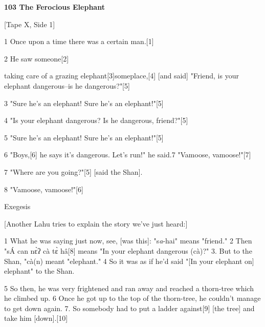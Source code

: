 
\textbf{103 The Ferocious Elephant }

[Tape X, Side 1]

1 Once upon a time there was a certain man.[1]

2 He saw someone[2]

taking care of a grazing elephant[3]someplace,[4] [and said] "Friend,
is your elephant dangerous--is he dangerous?"[5]

3 "Sure he's an elephant! Sure he's an elephant!"[5]

4 "Is your elephant dangerous? Is he dangerous, friend?"[5]

5 "Sure he's an elephant! Sure he's an elephant!"[5]

6 "Boys,[6] he says it's dangerous. Let's run!" he said.7 "Vamoose,
vamoose!"[7]

7 "Where are you going?"[5] [said the Shan].

8 "Vamoose, vamoose!"[6]

\begin{center}
Exegesis
\end{center}

\leftskip=0pt
[Another Lahu tries to explain the story we've just heard:]

1 What he was saying just now, see, [was this]: "s\textit{a}-hai"
means "friend." 2 Then "sÁ can nɛ̀ʔ cà tɛ̀ hâ[8]
means "In your elephant dangerous (cà)?" 3. But to the Shan,
"cà(n) meant "elephant." 4 So it was as if he'd said
"[In your elephant on] elephant" to the Shan.

5 So then, he was very frightened and ran away and reached a thorn-tree which he
climbed up. 6 Once he got up to the top of the thorn-tree, he couldn't manage to
get down again. 7. So somebody had to put a ladder against[9] [the tree] and take
him [down].[10]

